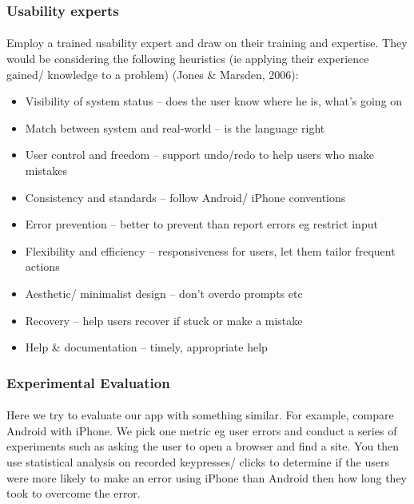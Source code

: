 \subsubsection{Usability experts}
\paragraph{} Employ a trained usability expert and draw on their training and expertise. They would be considering the following heuristics (ie applying their experience gained/ knowledge to a problem) (Jones \& Marsden, 2006):

\begin{itemize}
\item Visibility of system status – does the user know where he is, what’s going on
\item Match between system and real-world – is the language right
\item User control and freedom – support undo/redo to help users who make mistakes
\item Consistency and standards – follow Android/ iPhone conventions
\item Error prevention – better to prevent than report errors eg restrict input
\item Flexibility and efficiency – responsiveness for users, let them tailor frequent actions
\item Aesthetic/ minimalist design – don’t overdo prompts etc
\item Recovery – help users recover if stuck or make a mistake
\item Help \& documentation – timely, appropriate help
\end{itemize}

\subsubsection{Experimental Evaluation}
\paragraph{} Here we try to evaluate our app with something similar. For example, compare Android  with iPhone. We pick one metric eg user errors and conduct a series of experiments such as asking the user to open a browser and find a site. You then use statistical analysis on recorded keypresses/ clicks to determine if the users were more likely to make an error using iPhone than Android then how long they took to overcome the error. 

